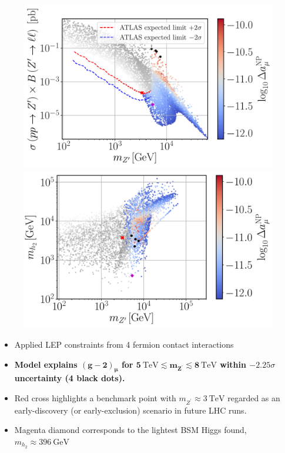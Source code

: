 \documentclass[10pt,xcolor=dvipsnames,mathserif]{beamer}
\renewcommand{\(}{\left(}
\renewcommand{\)}{\right)}
\renewcommand{\[}{\left[}
\renewcommand{\]}{\right]}
\begin{document}
\begin{frame}

\begin{figure}[!htb]
	\centering
	\includegraphics[scale=0.27]{mZp_Xsec_Amu.pdf}
	\includegraphics[scale=0.27]{mZp_Mhp_Amu.pdf}
\end{figure}		
		\vskip-2mm
		\begin{itemize}
			\item Applied LEP constraints from 4 fermion contact interactions
			\vskip2mm
			\item {\bf Model explains $\bm{\(g-2\)_\mu}$ for $\bm{5~\mathrm{TeV} \lesssim m_{Z^\prime} \lesssim 8~\mathrm{TeV}}$ within $-2.25\sigma$ uncertainty (4 black dots).}
			\vskip2mm
			\item Red cross highlights a benchmark point with $m_{Z^\prime} \approx 3~\mathrm{TeV}$ regarded as an early-discovery (or early-exclusion) scenario in future LHC runs.
			\vskip2mm
			\item Magenta diamond corresponds to the lightest BSM Higgs found, $m_{h_2} \approx 396~\mathrm{GeV}$
		\end{itemize}
	
\end{frame}
\end{document}
